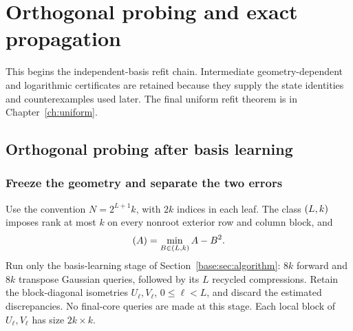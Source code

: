 \documentclass[11pt,oneside,openany,a4paper]{book}
\numberwithin{equation}{chapter}
\theoremstyle{definition}
\theoremstyle{remark}
\newcommand{\proofstep}[1]{\par\addvspace{.45\baselineskip}\Needspace{3\baselineskip}\textbf{#1}\par\nobreak}
\newcommand{\R}{\mathbb R}\newcommand{\E}{\mathbb E}\newcommand{\Prb}{\mathbb P}\newcommand{\PP}{\mathbb P}
\newcommand{\T}{\mathsf T}\newcommand{\Id}{I}
\newcommand{\F}[1]{\left\lVert#1\right\rVert_F}
\newcommand{\N}[1]{\left\lVert#1\right\rVert}
\newcommand{\op}[1]{\left\lVert#1\right\rVert_{\rm op}}
\newcommand{\ip}[2]{\left\langle#1,#2\right\rangle_F}
\DeclareMathOperator{\tr}{tr}\DeclareMathOperator{\rank}{rank}
\DeclareMathOperator{\diag}{blockdiag}\DeclareMathOperator{\range}{range}
\DeclareMathOperator{\HSS}{HSS}\DeclareMathOperator{\dist}{dist}
\DeclareMathOperator{\Var}{Var}\DeclareMathOperator{\supp}{supp}
\newcommand{\UC}{\mathcal U}\newcommand{\VC}{\mathcal V}\newcommand{\err}{\mathcal E}
\newcommand{\Sn}[2]{\left\lVert#1\right\rVert_{S_{#2}}}
\newcommand{\Cov}{\mathsf C}\newcommand{\Loss}{\mathsf L}\newcommand{\Fil}{\mathcal F}
\DeclareMathOperator{\diver}{div}\DeclareMathOperator{\vecop}{vec}\DeclareMathOperator{\Gammafun}{Gamma}
\begin{document}
\begingroup
\let\R\relax
\newcommand{\R}{\mathbb R}
\let\E\relax
\newcommand{\E}{\mathbb E}
\let\Prb\relax
\newcommand{\Prb}{\mathbb P}
\let\T\relax
\newcommand{\T}{\mathsf T}
\let\F\relax
\newcommand{\F}[1]{\left\lVert#1\right\rVert_{F}}
\let\N\relax
\newcommand{\N}[1]{\left\lVert#1\right\rVert}
\let\ip\relax
\newcommand{\ip}[2]{\left\langle#1,#2\right\rangle_F}
\let\tr\relax
\newcommand{\tr}{\operatorname{tr}}
\let\rank\relax
\newcommand{\rank}{\operatorname{rank}}
\let\diag\relax
\newcommand{\diag}{\operatorname{blockdiag}}
\let\range\relax
\newcommand{\range}{\operatorname{range}}
\let\OPT\relax
\newcommand{\OPT}{\operatorname{OPT}}
\let\HSS\relax
\newcommand{\HSS}{\operatorname{HSS}}
\let\diver\relax
\newcommand{\diver}{\operatorname{div}}
\let\Var\relax
\newcommand{\Var}{\operatorname{Var}}
\let\UC\relax
\newcommand{\UC}{\mathcal U}
\let\VC\relax
\newcommand{\VC}{\mathcal V}
\let\err\relax
\newcommand{\err}{\mathcal E}
\let\proofstep\relax
\newcommand{\proofstep}[1]{\par\addvspace{.45\baselineskip}\Needspace{3\baselineskip}\textbf{#1}\par\nobreak}
\let\op\relax
\newcommand{\op}[1]{\left\lVert#1\right\rVert_{\mathrm{op}}}
\let\Sn\relax
\newcommand{\Sn}[2]{\left\lVert#1\right\rVert_{S_{#2}}}
\let\Cov\relax
\newcommand{\Cov}{\mathsf C}
\let\Loss\relax
\newcommand{\Loss}{\mathsf L}
\let\Fil\relax
\newcommand{\Fil}{\mathcal F}
\let\Id\relax
\newcommand{\Id}{I}
\let\supp\relax
\newcommand{\supp}{\operatorname{supp}}
\let\vecop\relax
\newcommand{\vecop}{\operatorname{vec}}
\let\Gammafun\relax
\newcommand{\Gammafun}{\operatorname{Gamma}}
\chapter{Orthogonal probing and exact propagation}\label{ch:probes}
\begin{scopebox}
This begins the independent-basis refit chain. Intermediate geometry-dependent and logarithmic certificates are retained because they supply the state identities and counterexamples used later. The final uniform refit theorem is in Chapter~\ref{ch:uniform}.
\end{scopebox}
\section{Orthogonal probing after basis learning}\label{base:sec:ortho-refit}
\subsection{Freeze the geometry and separate the two errors}
Use the convention $N=2^{L+1}k$, with $2k$ indices in each leaf.
The class $\HSS(L,k)$ imposes rank at most $k$ on every nonroot exterior
row and column block, and
\[
 \OPT(A)=\min_{B\in\HSS(L,k)}\F{A-B}^2.
\]
Run only the basis-learning stage of Section~\ref{base:sec:algorithm}: $8k$ forward and $8k$ transpose
Gaussian queries, followed by its $L$ recycled compressions. Retain the
block-diagonal isometries $U_\ell,V_\ell$, $0\le\ell<L$, and discard the
estimated discrepancies. No final-core queries are made at this stage.
Each local block of $U_\ell,V_\ell$ has size $2k\times k$.
\end{document}
